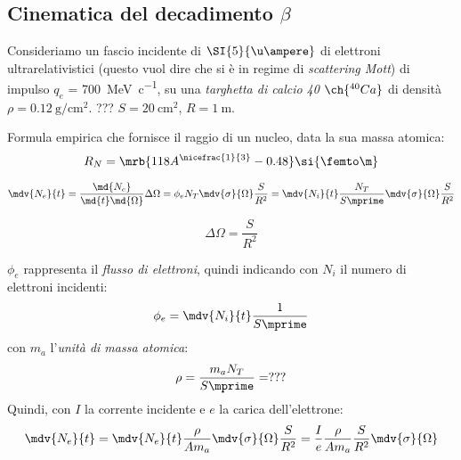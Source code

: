 \subsection{Cinematica del decadimento $\beta$}

\begin{example}
  Consideriamo un fascio incidente di $\SI{5}{\u\ampere}$ di elettroni
  ultrarelativistici (questo vuol dire che si è in regime di \textit{scattering
  Mott}) di impulso $q_e$ = \SI{700}{\MeV\per c}, su una \textit{targhetta di
  calcio 40} $\ch{^{40}Ca}$ di densità $\rho = \SI{0.12}{\g \per \cm^2}$.
  ??? $S = \SI{20}{\cm^2}$, $R = \SI{1}{\m}$.


  Formula empirica che fornisce il raggio di un nucleo, data la sua massa
  atomica:
  \begin{equation}
    R_N = \mrb{118 A ^{\nicefrac{1}{3}} - 0.48} \si{\femto\m}
  \end{equation}

  \begin{equation}
    \mdv{N_e}{t} = \frac{\md{N_e}}{\md{t} \md{\Omega}} \Delta \Omega = \phi_e
    N_T \mdv{\sigma}{\Omega} \frac{S}{R^2} = \mdv{N_i}{t} \frac{N_T}{S \mprime}
    \mdv{\sigma}{\Omega} \frac{S}{R^2}
  \end{equation}
  
  \begin{equation}
    \Delta \Omega = \frac{S}{R^2}
  \end{equation}

  $\phi_e$ rappresenta il \textit{flusso di elettroni}, quindi indicando con
  $N_i$ il numero di elettroni incidenti:
  \begin{equation}
    \phi _{e} = \mdv{N_i}{t} \frac{1}{S \mprime}
  \end{equation}
  con $m_a$ l'\textit{unità di massa atomica}:
  \begin{equation}
    \rho = \frac{m _a N_T}{S \mprime} = ??? %
  \end{equation}
  Quindi, con $I$ la corrente incidente e $e$ la carica dell'elettrone:
  \begin{equation}
    \mdv{N_e}{t} = \mdv{N_e}{t} \frac{\rho}{A m_a} \mdv{\sigma}{\Omega}
    \frac{S}{R^2} = \frac{I}{e} \frac{\rho}{A m_a} \frac{S}{R^2}
    \mdv{\sigma}{\Omega}
  \end{equation}


\end{example}
